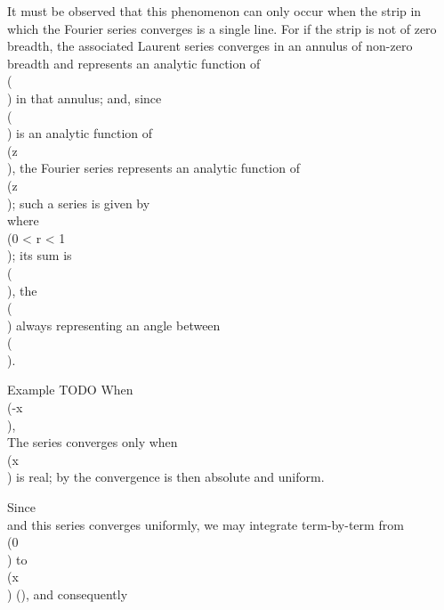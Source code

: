It must be observed that this phenomenon can only occur when the
strip in which the Fourier series converges is a single line.
For if the strip is not of zero breadth, the associated Laurent
series converges in an annulus of non-zero breadth and represents an
analytic function of \\(\zeta\\) in that annulus; and, since
\\(\zeta\\) is an analytic function of \\(z\\), the Fourier series
represents an analytic function of \\(z\\); such a series is given by
\\[ 
r \sin x
- \frac{1}{2} r^{2} \sin 2x
+ \frac{1}{3} r^{3} \sin 3x
- \cdots,
\\] 
where \\(0 < r < 1\\); its sum is
\\(\arctan {}\\), the \\(\arctan\\) always
representing an angle between \\(\pm {} \pi\\).

Example TODO
When \\(-\pi \leq x \leq \pi\\),
\\[ 
\sum_{n=1}^{\infty}
\frac{(-)^{n-1} \cos nx}{n^{2}}
=
\frac{1}{12} \pi^{2}
-
\frac{1}{4} x^{2}.
\\] 

The series converges only when \\(x\\) is real; by
 the convergence is then
absolute and uniform.

Since
\\[ 
\frac{1}{2} x
=
\sin x
- \frac{1}{2} \sin 2x
+ \frac{1}{3} \sin 3x
- \cdots
\quad
(-\pi + \delta \leq x \pi - \delta,
\delta > 0),
\\] 
and this series converges uniformly, we may integrate
term-by-term from \\(0\\) to \\(x\\) (),
and consequently
\\[ 
\frac{1}{4} x^{2}
=
\sum_{n=1}^{\infty}
\frac{(-)^{n-1} (1 - \cos nx)}{n^{2}}
\quad
(-\pi + \delta \leq x \leq \pi - \delta).
\\] 
%
%

